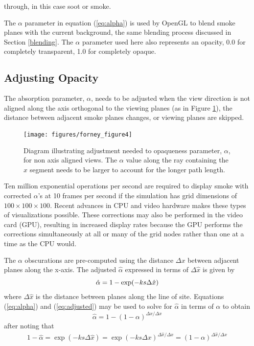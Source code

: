through, in this case soot or smoke.

The $\alpha$ parameter in equation (\ref{eq:alpha}) is used by
OpenGL to blend smoke planes with the current background, the same
blending process discussed in Section \ref{blending}.  The
$\alpha$ parameter used here also represents an opacity, 0.0 for
completely transparent, 1.0 for completely opaque.

%
%

\subsection{Adjusting Opacity}

The absorption parameter, $\alpha$, needs to be adjusted when the
view direction is not aligned along the axis orthogonal to the
viewing planes (as in Figure \ref{figray}), the distance between
adjacent smoke planes changes, or viewing planes are skipped.
\begin{figure}[\figoptions]
\centerline{\texttt{[image: figures/forney\_figure4]}}
\caption [Diagram illustrating the adjustment needed to opaqueness
parameter, $\alpha$, for non axis aligned views.] { Diagram
illustrating adjustment needed to opaqueness parameter, $\alpha$,
for non axis aligned views. The $\alpha$ value along the ray
containing the $\hat{x}$ segment needs to be larger to account for
the longer path length. } \label{figray}
\end{figure}

Ten million exponential operations per second are required to
display smoke with corrected $\alpha$'s at 10 frames per second if
the simulation has grid dimensions of $100\times 100\times 100$.
Recent advances in CPU and video hardware makes these types of
visualizations possible. These corrections may also be performed
in the video card (GPU), resulting in increased display rates
because the GPU performs the corrections simultaneously at all or
many of the grid nodes rather than one at a time as the CPU would.

The $\alpha$ obscurations are pre-computed using the distance
$\Delta x$ between adjacent planes along the x-axis. The adjusted
$\hat{\alpha}$ expressed in terms of $\Delta\hat{x}$ is given by
\begin{equation}
\label{eq:adjusted}
\hat{\alpha}=1-\exp(-ks\Delta \hat{x})\\
\end{equation}
where $\Delta\hat{x}$ is the distance between planes along the line of site.
Equations (\ref{eq:alpha}) and (\ref{eq:adjusted}) may be used to
solve for $\hat{\alpha}$ in terms of $\alpha$ to obtain
\begin{equation}
\label{eq:alphahat}
\hat{\alpha}=1-(1-\alpha)^{\Delta\hat{x}/\Delta x}
\end{equation}
after noting that
\begin{eqnarray*}
1-\hat{\alpha}=\exp(-ks\Delta\hat{x})=\exp(-ks\Delta
x)^{\Delta\hat{x}/\Delta x}=(1-\alpha)^{\Delta\hat{x}/\Delta x}
\end{eqnarray*}

